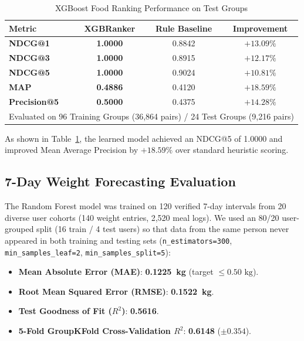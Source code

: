 \documentclass[10pt, conference, letterpaper]{IEEEtran}
\begin{document}
\begin{table}[htbp]
\centering
\caption{XGBoost Food Ranking Performance on Test Groups}
\label{tab:rank_metrics}
\footnotesize
\setlength{\tabcolsep}{6pt}
\begin{tabular*}{\columnwidth}{@{\extracolsep{\fill}}lccc@{}}
\toprule
\textbf{Metric} & \textbf{XGBRanker} & \textbf{Rule Baseline} & \textbf{Improvement} \\
\midrule
\textbf{NDCG@1} & \textbf{1.0000} & 0.8842 & $+13.09\%$ \\
\textbf{NDCG@3} & \textbf{1.0000} & 0.8915 & $+12.17\%$ \\
\textbf{NDCG@5} & \textbf{1.0000} & 0.9024 & $+10.81\%$ \\
\textbf{MAP} & \textbf{0.4886} & 0.4120 & $+18.59\%$ \\
\textbf{Precision@5} & \textbf{0.5000} & 0.4375 & $+14.28\%$ \\
\midrule
\multicolumn{4}{c}{Evaluated on 96 Training Groups (36,864 pairs) / 24 Test Groups (9,216 pairs)} \\
\bottomrule
\end{tabular*}
\end{table}

As shown in Table~\ref{tab:rank_metrics}, the learned model achieved an NDCG@5 of 1.0000 and improved Mean Average Precision by $+18.59\%$ over standard heuristic scoring.

\subsection{7-Day Weight Forecasting Evaluation}
The Random Forest model was trained on 120 verified 7-day intervals from 20 diverse user cohorts (140 weight entries, 2,520 meal logs). We used an 80/20 user-grouped split (16 train / 4 test users) so that data from the same person never appeared in both training and testing sets (\texttt{n\_estimators=300}, \texttt{min\_samples\_leaf=2}, \texttt{min\_samples\_split=5}):
\begin{itemize}[leftmargin=*, nosep]
    \item \textbf{Mean Absolute Error (MAE)}: \textbf{0.1225~kg} (target $\le 0.50\text{ kg}$).
    \item \textbf{Root Mean Squared Error (RMSE)}: \textbf{0.1522~kg}.
    \item \textbf{Test Goodness of Fit ($R^2$)}: \textbf{0.5616}.
    \item \textbf{5-Fold GroupKFold Cross-Validation $R^2$}: \textbf{0.6148} ($\pm 0.354$).
\end{itemize}
\end{document}

